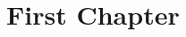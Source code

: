 \documentclass[
	fontsize=10pt, %
	twoside=false, %
	secnumdepth=1, %
]{kaobook}
\begin{document}



\mainmatter %

\chapter{First Chapter}




\newcommand{\repExo}{Application_01_ROV}
\newcommand{\nomExo}{Application_01_ROV}

\end{document}
